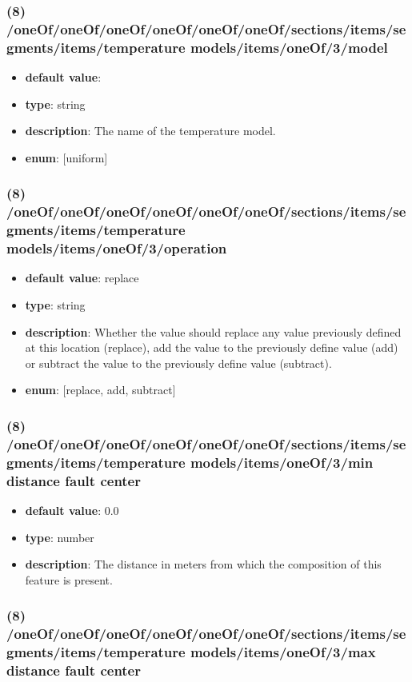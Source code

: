 \subsubsection{(8) /oneOf/oneOf/oneOf/oneOf/oneOf/oneOf/sections/items/segments/items/temperature models/items/oneOf/3/model}
\begin{itemize}[leftmargin=8em]\item {\bf default value}: 
\item {\bf type}: string
\item {\bf description}: The name of the temperature model.
\item {\bf enum}: [uniform]\end{itemize}\subsubsection{(8) /oneOf/oneOf/oneOf/oneOf/oneOf/oneOf/sections/items/segments/items/temperature models/items/oneOf/3/operation}
\begin{itemize}[leftmargin=8em]\item {\bf default value}: replace
\item {\bf type}: string
\item {\bf description}: Whether the value should replace any value previously defined at this location (replace), add the value to the previously define value (add) or subtract the value to the previously define value (subtract).
\item {\bf enum}: [replace, add, subtract]\end{itemize}\subsubsection{(8) /oneOf/oneOf/oneOf/oneOf/oneOf/oneOf/sections/items/segments/items/temperature models/items/oneOf/3/min distance fault center}
\begin{itemize}[leftmargin=8em]\item {\bf default value}: 0.0
\item {\bf type}: number
\item {\bf description}: The distance in meters from which the composition of this feature is present.
\end{itemize}\subsubsection{(8) /oneOf/oneOf/oneOf/oneOf/oneOf/oneOf/sections/items/segments/items/temperature models/items/oneOf/3/max distance fault center}
